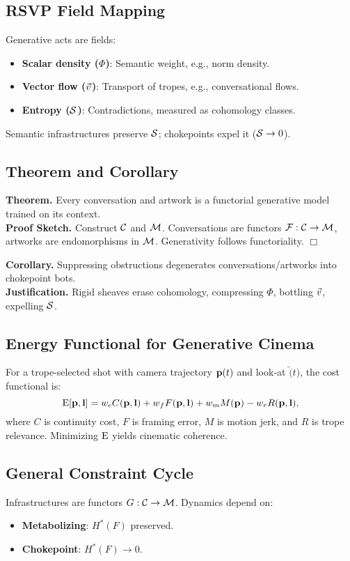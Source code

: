 \subsection{RSVP Field Mapping}
Generative acts are fields:
\begin{itemize}
    \item \textbf{Scalar density ($\Phi$)}: Semantic weight, e.g., norm density.
    \item \textbf{Vector flow ($\vec{v}$)}: Transport of tropes, e.g., conversational flows.
    \item \textbf{Entropy ($\mathcal{S}$)}: Contradictions, measured as cohomology classes.
\end{itemize}
Semantic infrastructures preserve $\mathcal{S}$; chokepoints expel it ($\mathcal{S} \to 0$).

\subsection{Theorem and Corollary}
\textbf{Theorem.} Every conversation and artwork is a functorial generative model trained on its context. \\
\textbf{Proof Sketch.} Construct $\mathcal{C}$ and $\mathcal{M}$. Conversations are functors $\mathcal{F}: \mathcal{C} \to \mathcal{M}$, artworks are endomorphisms in $\mathcal{M}$. Generativity follows functoriality. \hfill $\Box$

\textbf{Corollary.} Suppressing obstructions degenerates conversations/artworks into chokepoint bots. \\
\textbf{Justification.} Rigid sheaves erase cohomology, compressing $\Phi$, bottling $\vec{v}$, expelling $\mathcal{S}$.

\subsection{Energy Functional for Generative Cinema}
For a trope-selected shot with camera trajectory $\mathbf{p}(t)$ and look-at $\lvec(t)$, the cost functional is:
\[
\mathrm{E}[\mathbf{p}, \mathbf{l}] = w_c C(\mathbf{p}, \mathbf{l}) + w_f F(\mathbf{p}, \mathbf{l}) + w_m M(\mathbf{p}) - w_r R(\mathbf{p}, \mathbf{l}),
\]
where $C$ is continuity cost, $F$ is framing error, $M$ is motion jerk, and $R$ is trope relevance. Minimizing $\mathrm{E}$ yields cinematic coherence.

\subsection{General Constraint Cycle}
Infrastructures are functors $G: \mathcal{C} \to \mathcal{M}$. Dynamics depend on:
\begin{itemize}
    \item \textbf{Metabolizing}: $H^*(F)$ preserved.
    \item \textbf{Chokepoint}: $H^*(F) \to 0$.
\end{itemize}


